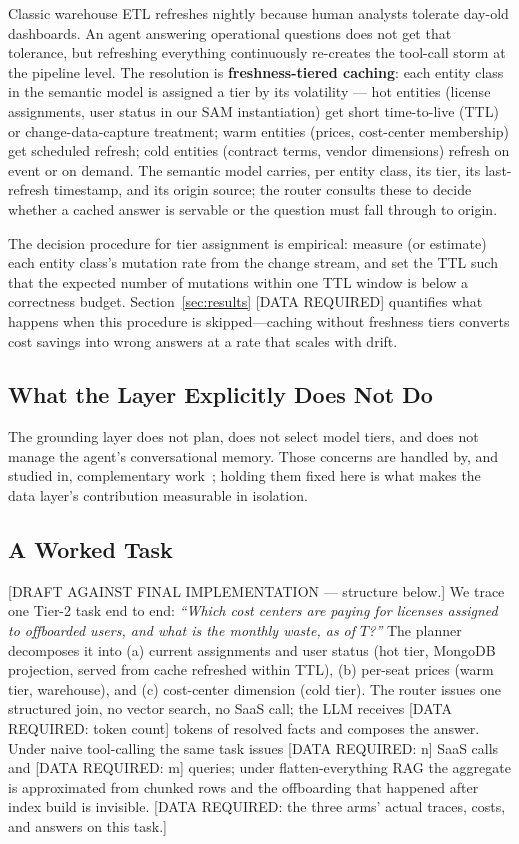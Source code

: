 \documentclass{ieeeaccess}
\begin{document}
Classic warehouse ETL refreshes nightly because human analysts tolerate
day-old dashboards. An agent answering operational questions does not get that
tolerance, but refreshing everything continuously re-creates the tool-call storm
at the pipeline level. The resolution is \textbf{freshness-tiered caching}: each
entity class in the semantic model is assigned a tier by its volatility --- hot
entities (license assignments, user status in our SAM instantiation) get short
time-to-live (TTL) or change-data-capture treatment; warm entities (prices,
cost-center membership) get scheduled refresh; cold entities (contract terms,
vendor dimensions) refresh on event or on demand. The semantic model carries, per
entity class, its tier, its last-refresh timestamp, and its origin source; the
router consults these to decide whether a cached answer is servable or the
question must fall through to origin.

The decision procedure for tier assignment is empirical: measure (or estimate)
each entity class's mutation rate from the change stream, and set the TTL such
that the expected number of mutations within one TTL window is below a
correctness budget. Section~\ref{sec:results} [DATA REQUIRED] quantifies what
happens when this procedure is skipped---caching without freshness tiers converts
cost savings into wrong answers at a rate that scales with drift.

\subsection{What the Layer Explicitly Does Not Do}
The grounding layer does not plan, does not select model tiers, and does not
manage the agent's conversational memory. Those concerns are handled by, and
studied in, complementary work~\cite{par, tca, memstrata}; holding them fixed here
is what makes the data layer's contribution measurable in isolation.

\subsection{A Worked Task}
\label{sec:worked}
[DRAFT AGAINST FINAL IMPLEMENTATION --- structure below.]
We trace one Tier-2 task end to end: \emph{``Which cost centers are paying for
licenses assigned to offboarded users, and what is the monthly waste, as of
$T$?''} The planner decomposes it into (a) current assignments and user status
(hot tier, MongoDB projection, served from cache refreshed within TTL), (b)
per-seat prices (warm tier, warehouse), and (c) cost-center dimension (cold
tier). The router issues one structured join, no vector search, no SaaS call;
the LLM receives [DATA REQUIRED: token count] tokens of resolved facts and
composes the answer. Under naive tool-calling the same task issues
[DATA REQUIRED: n] SaaS calls and [DATA REQUIRED: m] queries; under
flatten-everything RAG the aggregate is approximated from chunked rows and the
offboarding that happened after index build is invisible. [DATA REQUIRED: the
three arms' actual traces, costs, and answers on this task.]
\end{document}
